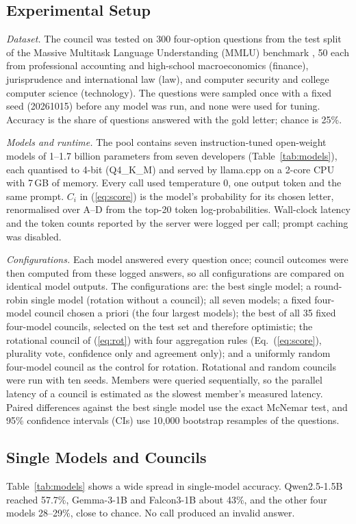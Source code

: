 \subsection{Experimental Setup}
\textit{Dataset.} The council was tested on 300 four-option questions from the test split of the Massive Multitask Language Understanding (MMLU) benchmark \cite{hendrycks2021mmlu}, 50 each from professional accounting and high-school macroeconomics (finance), jurisprudence and international law (law), and computer security and college computer science (technology). The questions were sampled once with a fixed seed (20261015) before any model was run, and none were used for tuning. Accuracy is the share of questions answered with the gold letter; chance is 25\%.

\textit{Models and runtime.} The pool contains seven instruction-tuned open-weight models of 1--1.7 billion parameters from seven developers (Table~\ref{tab:models}), each quantised to 4-bit (Q4\_K\_M) and served by llama.cpp \cite{llamacpp} on a 2-core CPU with 7\,GB of memory. Every call used temperature 0, one output token and the same prompt. $C_i$ in (\ref{eq:score}) is the model's probability for its chosen letter, renormalised over A--D from the top-20 token log-probabilities. Wall-clock latency and the token counts reported by the server were logged per call; prompt caching was disabled.

\textit{Configurations.} Each model answered every question once; council outcomes were then computed from these logged answers, so all configurations are compared on identical model outputs. The configurations are: the best single model; a round-robin single model (rotation without a council); all seven models; a fixed four-model council chosen a priori (the four largest models); the best of all 35 fixed four-model councils, selected on the test set and therefore optimistic; the rotational council of (\ref{eq:rot}) with four aggregation rules (Eq.~(\ref{eq:score}), plurality vote, confidence only and agreement only); and a uniformly random four-model council as the control for rotation. Rotational and random councils were run with ten seeds. Members were queried sequentially, so the parallel latency of a council is estimated as the slowest member's measured latency. Paired differences against the best single model use the exact McNemar test, and 95\% confidence intervals (CIs) use 10,000 bootstrap resamples of the questions.

\subsection{Single Models and Councils}
Table~\ref{tab:models} shows a wide spread in single-model accuracy. Qwen2.5-1.5B reached 57.7\%, Gemma-3-1B and Falcon3-1B about 43\%, and the other four models 28--29\%, close to chance. No call produced an invalid answer.

